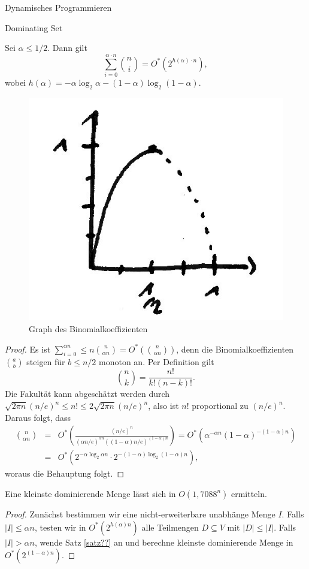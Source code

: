 \begin{chapter}{Dynamisches Programmieren}
\begin{section}{Dominating Set}
  \begin{lemma}
    Sei \(\alpha \leq 1/2\). Dann gilt \[ \sum_{i=0}^{\alpha \cdot n} \binom{n}{i} = O^*( 2^{h(\alpha) \cdot n} ), \] wobei \(h(\alpha) = - \alpha \log_2 \alpha - (1-\alpha) \log_2(1 - \alpha)\).
  \end{lemma}
  
  \begin{figure}[h]
    \centering
    \includegraphics[width=.25\textwidth]{./Bilder/b01.jpg}
    \caption{Graph des Binomialkoeffizienten}
  \end{figure}
  
  \begin{proof}
    Es ist \( \sum_{i=0}^{\alpha n} \leq n \binom{n}{\alpha n} = O^*( \binom{n}{\alpha n} ) \), denn die Binomialkoeffizienten \( \binom{a}{b} \) steigen für \(b \leq n/2\) monoton an. Per Definition gilt 
    \[ \binom{n}{k} = \frac{n!}{k! (n-k)!}. \]
    Die Fakultät kann abgeschätzt werden durch \( \sqrt{2 \pi n} (n/e)^n \leq n! \leq 2 \sqrt{2 \pi n} (n/e)^n \), also ist \(n!\) proportional zu \((n/e)^n\). Daraus folgt, dass 
    \begin{eqnarray*}
      \binom{n}{\alpha n} &=& O^* \left( \frac{(n/e)^n}{(\alpha n/e)^{\alpha n} ( (1-\alpha)n/e)^{(1-\alpha) n}} \right) = O^* \left( \alpha^{-\alpha n} (1-\alpha)^{-(1-\alpha)n} \right) \\
      &=& O^* \left( 2^{-\alpha \log_2 \alpha n} \cdot 2^{-(1 - \alpha) \log_2(1-\alpha)n} \right),
    \end{eqnarray*}
    woraus die Behauptung folgt.
  \end{proof}
  
  \begin{theorem}
    Eine kleinste dominierende Menge lässt sich in \(O(1{,}7088^n)\) ermitteln.
  \end{theorem}
  
  \begin{proof}
    Zunächst bestimmen wir eine nicht-erweiterbare unabhänge Menge \(I\). 
    Falls \(|I| \leq \alpha n\), testen wir in \(O^*(2^{h(\alpha) n})\) alle Teilmengen \(D \subseteq V\) mit \(|D| \leq |I|\).
    Falls \(|I| > \alpha n\), wende Satz \ref{satz??} an und berechne kleinste dominierende Menge in \(O^*(2^{(1-\alpha)n})\). %
    

\end{proof}
\end{section}
\end{chapter}
